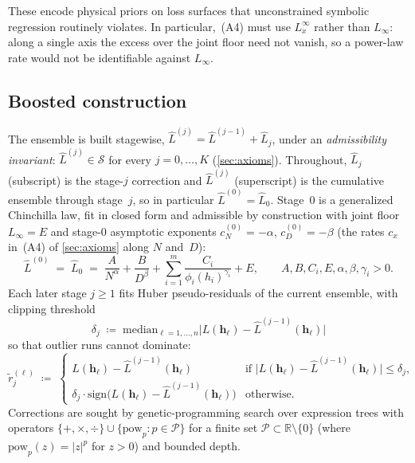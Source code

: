 \documentclass[11pt]{article}
\newcommand{\calS}{\mathcal{S}}
\newcommand{\calP}{\mathcal{P}}
\newcommand{\bbR}{\mathbb{R}}
\newcommand{\Lhat}{\hat{L}}
\begin{document}
These encode physical priors on loss surfaces that unconstrained symbolic regression routinely violates.
In particular,~(A4) must use $L^{\infty}_{x}$ rather than $L_\infty$: along a single axis the excess over the joint floor need not vanish, so a power-law rate would not be identifiable against $L_\infty$.

\subsection{Boosted construction}\label{sec:boosting}
The ensemble is built stagewise,
$\Lhat^{(j)} = \Lhat^{(j-1)} + \Lhat_j$, under an \emph{admissibility invariant}:
$\Lhat^{(j)} \in \calS$ for every $j = 0, \ldots, K$ (\cref{sec:axioms}).
Throughout, $\Lhat_j$ (subscript) is the stage-$j$ correction and
$\Lhat^{(j)}$ (superscript) is the cumulative ensemble through stage~$j$,
so in particular $\Lhat^{(0)} = \Lhat_0$.
Stage~$0$ is a generalized Chinchilla law, fit in closed form and admissible by
construction with joint floor $L_\infty = E$ and stage-0 asymptotic exponents
$c_N^{(0)} = -\alpha$, $c_D^{(0)} = -\beta$ (the rates $c_x$ in~(A4) of \cref{sec:axioms} along $N$ and~$D$):
\begin{equation}\label{eq:chinchilla-bb}
    \Lhat^{(0)} \;=\; \Lhat_0 \;=\;
    \frac{A}{N^{\alpha}} + \frac{B}{D^{\beta}}
    + \sum_{i=1}^{m} \frac{C_i}{\phi_i(h_i)^{\gamma_i}} + E,
    \qquad A, B, C_i, E, \alpha, \beta, \gamma_i > 0 .
\end{equation}
Each later stage $j \geq 1$ fits Huber pseudo-residuals of the current ensemble,
with clipping threshold
\begin{equation}\label{eq:delta-bb}
    \delta_j
    \;\coloneqq\;
    \mathrm{median}_{\ell=1,\ldots,n}
    \bigl|L(\mathbf{h}_\ell) - \Lhat^{(j-1)}(\mathbf{h}_\ell)\bigr|
\end{equation}
so that outlier runs cannot dominate:
\begin{equation}\label{eq:pseudoresid-bb}
    \tilde{r}_j^{(\ell)}
    \;\coloneqq\;
    \begin{cases}
        L(\mathbf{h}_\ell) - \Lhat^{(j-1)}(\mathbf{h}_\ell)
            & \text{if }
              \bigl|L(\mathbf{h}_\ell) - \Lhat^{(j-1)}(\mathbf{h}_\ell)\bigr|
              \leq \delta_j, \\[3pt]
        \delta_j \cdot
          \mathrm{sign}\bigl(L(\mathbf{h}_\ell)
                        - \Lhat^{(j-1)}(\mathbf{h}_\ell)\bigr)
            & \text{otherwise}.
    \end{cases}
\end{equation}
Corrections are sought by genetic-programming search over expression trees with
operators $\{+, \times, \div\} \cup \{\mathrm{pow}_p : p \in \calP\}$
for a finite set $\calP \subset \bbR \setminus \{0\}$
(where $\mathrm{pow}_p(z) = |z|^p$ for $z > 0$) and bounded depth.
\end{document}
